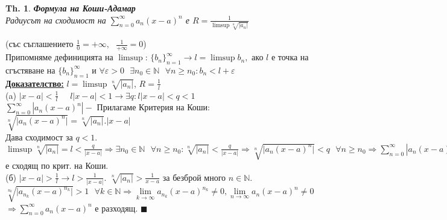 \documentclass[12pt]{article}
\newtheorem{theorem}{Th.}
\newcommand{\spc}{\text{ }}
\begin{document}
	\begin{theorem}
		\textbf{Формула на Коши-Адамар}\\
		Радиусът на сходимост на $\sum_{n=0}^{\infty}a_n(x-a)^n$ е $R = \frac{1}{\limsup\sqrt[n]{\mathbf{|}a_n\mathbf{|}}}$
	\end{theorem}
	(със съглашението $\textstyle\frac{1}{0}=+\infty,\spc\frac{1}{+\infty}=0$)\\
	Припомняме дефиницията на $\limsup$: $\{b_n\}_{n=1}^{\infty}\rightarrow l = \limsup b_n,$ ако $l$ е точка на сгъстяване на $\{b_n\}_{n=1}^{\infty}$ и $\forall \varepsilon > 0 \spc\exists n_0 \in \mathbb{N} \spc\forall n \geq n_0 : b_n < l + \varepsilon$\\
	
	\textbf{\underline{Доказателство:}} $l = \limsup\sqrt[n]{|a_n|}$, $R = \frac{1}{l}$\\
	(a) $|x-a|<\frac{1}{l}$ $\quad l|x-a|<1\rightarrow \exists q : l|x-a|<q<1$\\
	$\sum_{n=0}^{\infty}|a_n(x-a)^n| - $ Прилагаме Критерия на Коши: $\sqrt[n]{\mathbf{|}a_n(x-a)^n\mathbf{|}}=\sqrt[n]{\mathbf{|}a_n\mathbf{|}}.|x-a|$\\Дава сходимост за $q<1$. 
	\begin{math}
		\limsup\sqrt[n]{\mathbf{|}a_n\mathbf{|}}=l<\frac{q}{|x-a|}\Rightarrow \exists n_0\in\mathbb{N}\spc\forall n \geq n_0 : \sqrt[n]{\mathbf{|}a_n\mathbf{|}} < \frac{q}{|x-a|}\Rightarrow \sqrt[n]{\mathbf{|}a_n(x-a)^n\mathbf{|}}<q\spc\forall n\geq n_0
		\Rightarrow \sum_{n=0}^{\infty}|a_n(x-a)^n|
	\end{math} е сходящ по крит. на Коши.\\
	(б) $|x-a|>\frac{1}{l} \rightarrow l > \frac{1}{|x-a|}$. 
	$\sqrt[n]{\mathbf{|}a_n\mathbf{|}} > \frac{1}{x-a}$ за безброй много $n\in\mathbb{N}$. $\sqrt[n_k]{\mathbf{|}a_{n_k}(x-a)^{n_k}\mathbf{|}} > 1 \spc\forall k \in \mathbb{N} \Rightarrow \lim\limits_{k\to\infty}a_{n_k}(x-a)^{n_k} \neq 0, \lim\limits_{n\to\infty}a_{n}(x-a)^{n} \neq 0 $
	$\Rightarrow \sum_{n=0}^{\infty}a_n(x-a)^n$ е разходящ.
	\hfill$\blacksquare$\\
\end{document}
